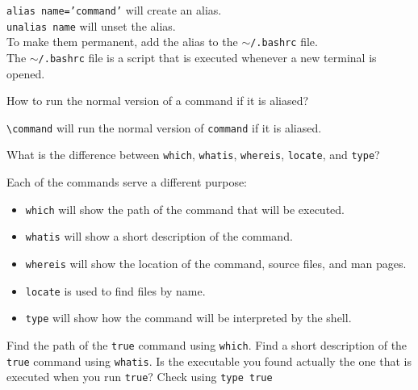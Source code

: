 \begin{ans}
  \texttt{alias name='command'} will create an alias. \\
  \texttt{unalias name} will unset the alias. \\
  To make them permanent, add the alias to the \texttt{$\sim$/.bashrc} file. \\
  The \texttt{$\sim$/.bashrc} file is a script that is executed whenever a new terminal is opened.
\end{ans}

\begin{qs}
  How to run the normal version of a command if it is aliased?
\end{qs}

\begin{ans}
  \texttt{\textbackslash command} will run the normal version of \texttt{command} if it is aliased.
\end{ans}

\begin{qs}
  What is the difference between \texttt{which}, \texttt{whatis}, \texttt{whereis}, \texttt{locate}, and \texttt{type}?
\end{qs}

\begin{ans}
  Each of the commands serve a different purpose:
  \begin{itemize}
    \item \texttt{which} will show the path of the command that will be executed.
    \item \texttt{whatis} will show a short description of the command.
    \item \texttt{whereis} will show the location of the command, source files, and man pages.
    \item \texttt{locate} is used to find files by name.
    \item \texttt{type} will show how the command will be interpreted by the shell.
  \end{itemize}
\end{ans}

\begin{exercise}
  Find the path of the \texttt{true} command using \texttt{which}.
  Find a short description of the \texttt{true} command using \texttt{whatis}.
  Is the executable you found actually the one that is executed when you run \texttt{true}? Check using \texttt{type true}
\end{exercise}

